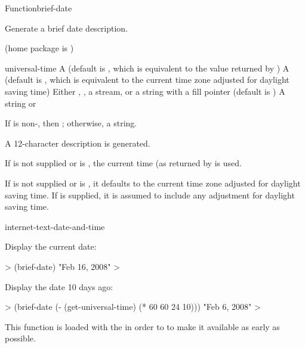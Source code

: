 \documentclass[10pt,twoside,english,pdftex]{article}
\begin{document}
\begin{functiondoc}{Function}{brief-date}{%
     
     
    \returns{} }
% 
% 

\fnsyntax

\fnpurpose Generate a brief date description.

\fnpackage {} (home package is )

\fnmodule {}

\fnargs
\begin{args}{universal-time}
 A  (default is \nil,
  which is equivalent to the value returned by
  )
 A  (default is \nil,
  which is equivalent to the current time zone adjusted for daylight
  saving time)
\arg[destination] Either \nil, , a stream, or a string with a fill 
pointer (default is \nil)
\arg[result] A string or \nil{}
\end{args}

\fnreturns If  is non-\nil, then \nil; otherwise, a string.

\fndescription 
A 12-character description is generated.

\W{}
%
If  is not supplied or is \nil, the current time
(as returned by  is used.  

\W{} If  is not supplied or is \nil, it defaults to the
current time zone adjusted for daylight saving time. If
 is supplied, it is assumed to include any adjustment
for daylight saving time.

\begin{alsos}{internet-text-date-and-time}
\end{alsos}

\fnexamples
Display the current date: 
%
\W\supp
\begin{example}
  > (brief-date)
  "Feb 16, 2008"
  >
\end{example}
%
Display the date 10 days ago:
%
\W\supp\notpretop
\begin{example}
  > (brief-date (- (get-universal-time) (* 60 60 24 10)))
  "Feb 6, 2008"
  >
\end{example}

\fnnote
{}%
%
%
This function is loaded with the  
in order to to make it available as early as possible.

\end{functiondoc}
\end{document}
